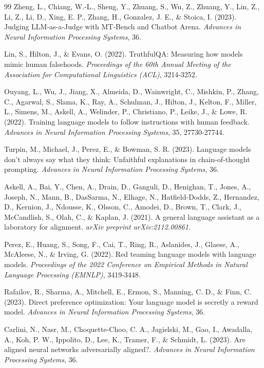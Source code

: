 \documentclass[sigconf,screen]{acmart}
\begin{document}
\begin{thebibliography}{99}
 Zheng, L., Chiang, W.-L., Sheng, Y., Zhuang, S., Wu, Z., Zhuang, Y., Lin, Z., Li, Z., Li, D., Xing, E. P., Zhang, H., Gonzalez, J. E., \& Stoica, I. (2023). Judging LLM-as-a-Judge with MT-Bench and Chatbot Arena. \textit{Advances in Neural Information Processing Systems}, 36.

 Lin, S., Hilton, J., \& Evans, O. (2022). TruthfulQA: Measuring how models mimic human falsehoods. \textit{Proceedings of the 60th Annual Meeting of the Association for Computational Linguistics (ACL)}, 3214-3252.

 Ouyang, L., Wu, J., Jiang, X., Almeida, D., Wainwright, C., Mishkin, P., Zhang, C., Agarwal, S., Slama, K., Ray, A., Schulman, J., Hilton, J., Kelton, F., Miller, L., Simens, M., Askell, A., Welinder, P., Christiano, P., Leike, J., \& Lowe, R. (2022). Training language models to follow instructions with human feedback. \textit{Advances in Neural Information Processing Systems}, 35, 27730-27744.

 Turpin, M., Michael, J., Perez, E., \& Bowman, S. R. (2023). Language models don't always say what they think: Unfaithful explanations in chain-of-thought prompting. \textit{Advances in Neural Information Processing Systems}, 36.

 Askell, A., Bai, Y., Chen, A., Drain, D., Ganguli, D., Henighan, T., Jones, A., Joseph, N., Mann, B., DasSarma, N., Elhage, N., Hatfield-Dodds, Z., Hernandez, D., Kernion, J., Ndousse, K., Olsson, C., Amodei, D., Brown, T., Clark, J., McCandlish, S., Olah, C., \& Kaplan, J. (2021). A general language assistant as a laboratory for alignment. \textit{arXiv preprint arXiv:2112.00861}.

 Perez, E., Huang, S., Song, F., Cai, T., Ring, R., Aslanides, J., Glaese, A., McAleese, N., \& Irving, G. (2022). Red teaming language models with language models. \textit{Proceedings of the 2022 Conference on Empirical Methods in Natural Language Processing (EMNLP)}, 3419-3448.

 Rafailov, R., Sharma, A., Mitchell, E., Ermon, S., Manning, C. D., \& Finn, C. (2023). Direct preference optimization: Your language model is secretly a reward model. \textit{Advances in Neural Information Processing Systems}, 36.

 Carlini, N., Nasr, M., Choquette-Choo, C. A., Jagielski, M., Gao, I., Awadalla, A., Koh, P. W., Ippolito, D., Lee, K., Tramer, F., \& Schmidt, L. (2023). Are aligned neural networks adversarially aligned?. \textit{Advances in Neural Information Processing Systems}, 36.


\end{thebibliography}
\end{document}
